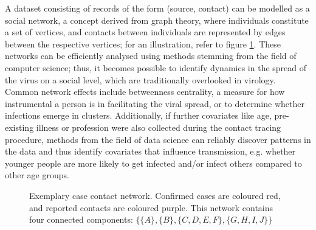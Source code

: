 A dataset consisting of records of the form (source, contact) can be modelled as a social network, a concept derived from graph theory, where individuals constitute a set of vertices, and contacts between individuals are represented by edges between the respective vertices; for an illustration, refer to figure \ref{fig:example_case_network}. These networks can be efficiently analysed using methods stemming from the field of computer science; thus, it becomes possible to identify dynamics in the spread of the virus on a social level, which are traditionally overlooked in virology. Common network effects include betweenness centrality, a measure for how instrumental a person is in facilitating the viral spread, or  to determine whether infections emerge in clusters. Additionally, if further covariates like age, pre-existing illness or profession were also collected during the contact tracing procedure, methods from the field of data science can reliably discover patterns in the data and thus identify covariates that influence transmission, e.g. whether younger people are more likely to get infected and/or infect others compared to other age groups.

\begin{figure}
	\centering
	\caption{Exemplary case contact network. Confirmed cases are coloured red, and reported contacts are coloured purple. This network contains four connected components: $\{\{A\},\{B\},\{C,D,E,F\},\{G,H,I,J\}\}$}
	\label{fig:example_case_network}
\end{figure}

